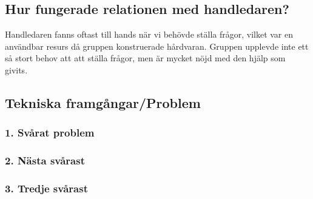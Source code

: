 ﻿\documentclass{article}
\begin{document}
\subsection{Hur fungerade relationen med handledaren?}
Handledaren fanns oftast till hands när vi behövde ställa frågor, vilket var en användbar resurs då gruppen konstruerade hårdvaran. Gruppen upplevde inte ett så stort behov att att ställa frågor, men är mycket nöjd med den hjälp som givits.

\subsection{Tekniska framgångar/Problem}

\subsubsection{1. Svårat problem}
\subsubsection{2. Nästa svårast}
\subsubsection{3. Tredje svårast}
\end{document}
